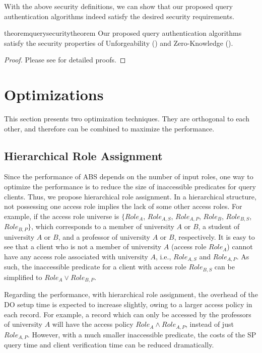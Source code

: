 With the above security definitions, we can show that our proposed query authentication algorithms indeed satisfy the desired security requirements.

\begin{restatable}{theorem}{querysecuritytheorem}\label{thm:access-control:sec}
  Our proposed query authentication algorithms satisfy the security properties of Unforgeability () and Zero-Knowledge ().
\end{restatable}

\begin{proof}
  Please see  for detailed proofs.
\end{proof}

\section{Optimizations}\label{sec:access-control:opt}

This section presents two optimization techniques. They are orthogonal to each other, and therefore can be combined to maximize the performance.

\subsection{Hierarchical Role Assignment}
Since the performance of ABS depends on the number of input roles, one way to optimize the performance is to reduce the size of inaccessible predicates for query clients. Thus, we propose hierarchical role assignment. In a hierarchical structure, not possessing one access role implies the lack of some other access roles. For example, if the access role universe is $\{{Role}_A$, ${Role}_{A,S}$, ${Role}_{A,P}$, ${Role}_B$, ${Role}_{B,S}$, ${Role}_{B,P}\}$, which corresponds to a member of university $A$ or $B$, a student of university $A$ or $B$, and a professor of university $A$ or $B$, respectively. It is easy to see that a client who is not a member of university $A$ (access role ${Role}_A$) cannot have any access role associated with university $A$, i.e., ${Role}_{A,S}$ and ${Role}_{A,P}$. As such, the inaccessible predicate for a client with access role ${Role}_{B,S}$ can be simplified to ${Role}_A \lor {Role}_{B,P}$.

Regarding the performance, with hierarchical role assignment, the overhead of the DO setup time is expected to increase slightly, owing to a larger access policy in each record. For example, a record which can only be accessed by the professors of university $A$ will have the access policy ${Role}_{A} \land {Role}_{A,P}$, instead of just ${Role}_{A,P}$.
However, with a much smaller inaccessible predicate, the costs of the SP query time and client verification time can be reduced dramatically.

